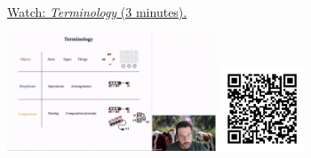 
\begin{minipage}{10cm}
    \href{https://act4e-spring21.netlify.app/videos/spring2021-operads-a:terminology-operad.html}{Watch: \emph{Terminology} (3 minutes).}
        
    \href{https://act4e-spring21.netlify.app/videos/spring2021-operads-a:terminology-operad.html}{\includegraphics[height=3.5cm]{spring2021-operads-a:terminology-operad/thumbnails.jpg}}
    \href{https://act4e-spring21.netlify.app/videos/spring2021-operads-a:terminology-operad.html}{\includegraphics[height=2.5cm]{spring2021-operads-a:terminology-operad/qrcode.png}}
\end{minipage}
